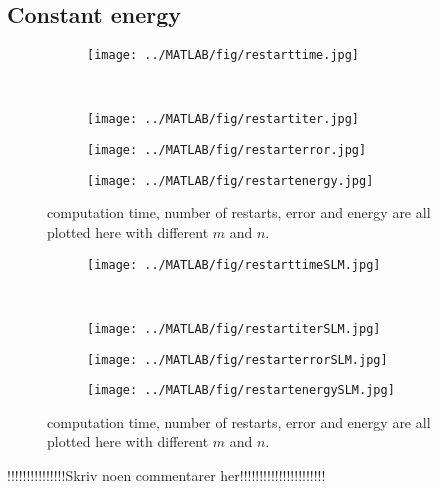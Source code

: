 \subsection{Constant energy}
\begin{figure}[H]
        \centering
        \begin{subfigure}[b]{0.45\textwidth}
                \texttt{[image: ../MATLAB/fig/restarttime.jpg]}
                \caption{  }
                \label{fig:restarttime}
        \end{subfigure}
        ~
        \begin{subfigure}[b]{0.45\textwidth}
                \texttt{[image: ../MATLAB/fig/restartiter.jpg]}
                \caption{  }
                \label{fig:restartiter}
        \end{subfigure}
        \begin{subfigure}[b]{0.45\textwidth}
                \texttt{[image: ../MATLAB/fig/restarterror.jpg]}
                \caption{  }
                \label{fig:restarterror}
        \end{subfigure}
        \begin{subfigure}[b]{0.45\textwidth}
                \texttt{[image: ../MATLAB/fig/restartenergy.jpg]}
                \caption{  }
                \label{fig:restartenergy}
        \end{subfigure}
        \caption{ computation time, number of restarts, error and energy are all plotted here with different $m$ and $n$. }
        \label{fig:restart}
\end{figure}

\begin{figure}[H]
        \centering
        \begin{subfigure}[b]{0.45\textwidth}
                \texttt{[image: ../MATLAB/fig/restarttimeSLM.jpg]}
                \caption{  }
                \label{fig:restarttimeSLM}
        \end{subfigure}
        ~
        \begin{subfigure}[b]{0.45\textwidth}
                \texttt{[image: ../MATLAB/fig/restartiterSLM.jpg]}
                \caption{  }
                \label{fig:restartiterSLM}
        \end{subfigure}
        \begin{subfigure}[b]{0.45\textwidth}
                \texttt{[image: ../MATLAB/fig/restarterrorSLM.jpg]}
                \caption{  }
                \label{fig:restarterrorSLM}
        \end{subfigure}
        \begin{subfigure}[b]{0.45\textwidth}
                \texttt{[image: ../MATLAB/fig/restartenergySLM.jpg]}
                \caption{  }
                \label{fig:restartenergySLM}
        \end{subfigure}
        \caption{ computation time, number of restarts, error and energy are all plotted here with different $m$ and $n$. }
        \label{fig:restartSLM}
\end{figure}
!!!!!!!!!!!!!!!Skriv noen commentarer her!!!!!!!!!!!!!!!!!!!!!!\\
